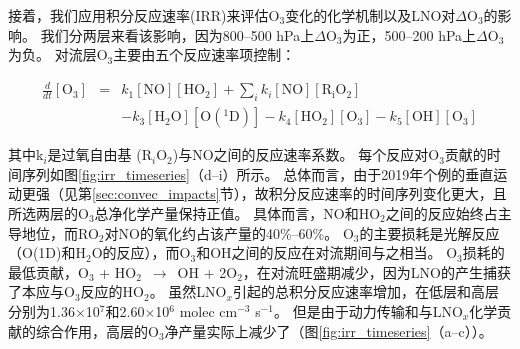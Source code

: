 接着，我们应用积分反应速率(IRR)来评估O$_3$变化的化学机制以及LNO对$\Delta$O$_3$的影响。
我们分两层来看该影响，因为800--500 hPa上$\Delta$O$_3$为正，500--200 hPa上$\Delta$O$_3$为负。
对流层O$_3$主要由五个反应速率项控制\citep{Pickering.1990}：

\begin{eqnarray}
  \frac{d}{dt}[\mathrm{O_3}] & = & k_1[\mathrm{NO}][\mathrm{HO_2}] + \sum_{i}  k_i[\mathrm{NO}][\mathrm{R_iO_2}] \nonumber \\
                             && - k_3[\mathrm{H_2O}][\mathrm{O(^1D)}] - k_4[\mathrm{HO_2}][\mathrm{O_3}] - k_5[\mathrm{OH}][\mathrm{O_3}]
\end{eqnarray}

其中k$_i$是过氧自由基 (R$_i$O$_2$)与NO之间的反应速率系数。
每个反应对O$_3$贡献的时间序列如图\ref{fig:irr_timeseries}（d--i）所示。
总体而言，由于2019年个例的垂直运动更强（见第\ref{sec:convec_impacts}节），故积分反应速率的时间序列变化更大，且所选两层的O$_3$总净化学产量保持正值。
具体而言，NO和HO$_2$之间的反应始终占主导地位，而RO$_2$对NO的氧化约占该产量的40\%--60\%。
O$_3$的主要损耗是光解反应（O(1D)和H$_2$O的反应），而O$_3$和OH之间的反应在对流期间与之相当。
O$_3$损耗的最低贡献，O$_3$ + HO$_2$ $\,\to\,$ OH + 2O$_2$，在对流旺盛期减少，因为LNO的产生捕获了本应与O$_3$反应的HO$_2$。
虽然LNO$_x$引起的总积分反应速率增加，在低层和高层分别为1.36$\times$10$^7$和2.60$\times$10$^6$ molec cm$^{-3}$ s$^{-1}$。
但是由于动力传输和与LNO$_x$化学贡献的综合作用，高层的O$_3$净产量实际上减少了（图\ref{fig:irr_timeseries}（a--c））。


